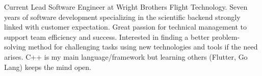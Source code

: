 \begin{cvparagraph}

Current Lead Software Engineer at Wright Brothers Flight Technology. Seven years of software development specializing in the scientific backend strongly linked with customer expectation. 
Great passion for technical management to support team efficiency and success. Interested in finding a better problem-solving method for challenging tasks using new technologies and tools if the need arises.
C++ is my main language/framework but learning others (Flutter, Go Lang) keeps the mind open.
\end{cvparagraph}
